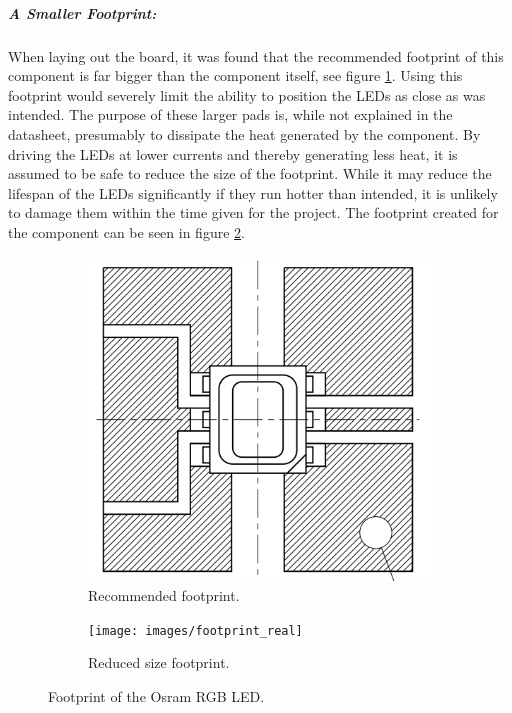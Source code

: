 \subparagraph{A Smaller Footprint:}
When laying out the board, it was found that the recommended footprint of this component is far bigger than the component itself, see figure \ref{fig:recommendedfootprint}.
Using this footprint would severely limit the ability to position the LEDs as close as was intended.
The purpose of these larger pads is, while not explained in the datasheet, presumably to dissipate the heat generated by the component.
By driving the LEDs at lower currents and thereby generating less heat, it is assumed to be safe to reduce the size of the footprint.
While it may reduce the lifespan of the LEDs significantly if they run hotter than intended, it is unlikely to damage them within the time given for the project.
The footprint created for the component can be seen in figure 
\ref{fig:finalfootprint}.

\begin{figure}[H]
	\begin{subfigure}[t]{.49\linewidth}
		\centering
		\includegraphics[width=.8\linewidth]{images/rgbfootprint}
		\caption{Recommended footprint.}
		\label{fig:recommendedfootprint}
	\end{subfigure}
	\begin{subfigure}[t]{.49\linewidth}
		\centering
		\texttt{[image: images/footprint\_real]}
		\caption{Reduced size footprint.}
		\label{fig:finalfootprint}
	\end{subfigure}
	\caption{Footprint of the Osram RGB LED.}
	\label{fig:footprint}
\end{figure}

